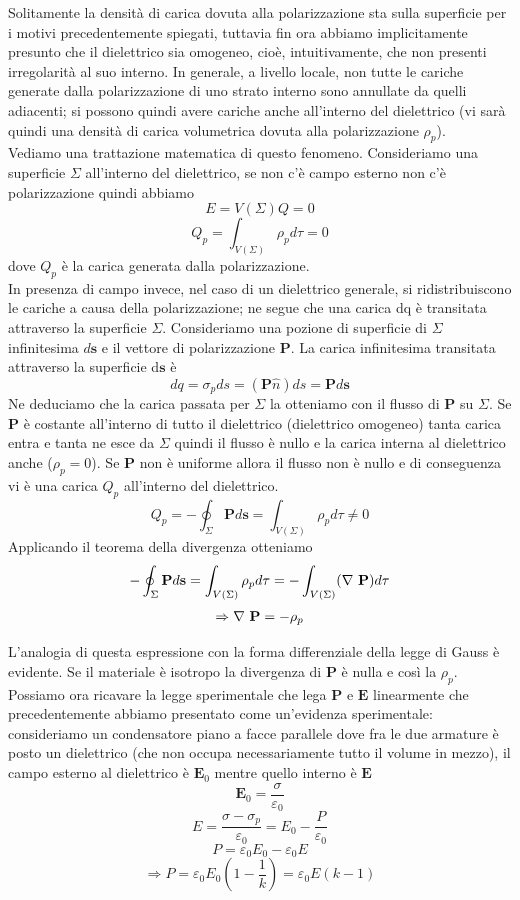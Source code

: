 \documentclass[
10pt, %
a4paper, %
oneside, %
headinclude,footinclude, %
BCOR5mm, %
]{scrartcl}
\begin{document}
Solitamente la densità di carica dovuta alla polarizzazione sta sulla superficie per i motivi precedentemente spiegati, tuttavia fin ora abbiamo implicitamente presunto che il dielettrico sia omogeneo, cioè, intuitivamente, che non presenti irregolarità al suo interno.
In generale, a livello locale, non tutte le cariche generate dalla polarizzazione di uno strato interno sono annullate da quelli adiacenti; si possono quindi avere cariche anche all'interno del dielettrico (vi sarà quindi una densità di carica volumetrica dovuta alla polarizzazione \(\rho_p\)).\\
Vediamo una trattazione matematica di questo fenomeno. Consideriamo una superficie $\Sigma$ all'interno del dielettrico, se non c'è campo esterno non c'è polarizzazione quindi abbiamo
\[E = V(\Sigma) Q = 0\]
\[Q_p = \int_{V(\Sigma)}\rho_p d\tau = 0\]
dove \(Q_p\) è la carica generata dalla polarizzazione.\\
In presenza di campo invece, nel caso di un dielettrico generale, si ridistribuiscono le cariche a causa della polarizzazione; ne segue che una carica dq è transitata attraverso la superficie $\Sigma$. Consideriamo una pozione di superficie di \(\Sigma\) infinitesima $d\mathbf{s}$ e il vettore di polarizzazione $\mathbf{P}$. La carica infinitesima transitata attraverso la superficie d$\mathbf{s}$ è
\[dq = \sigma_pds=(\mathbf{P}\hat{n})ds = \mathbf{P}d\mathbf{s}\]
Ne deduciamo che la carica passata per \(\Sigma\) la otteniamo con il flusso di $\mathbf{P}$ su $\Sigma$. Se $\mathbf{P}$ è costante all'interno di tutto il dielettrico (dielettrico omogeneo) tanta carica entra e tanta ne esce da $\Sigma$ quindi il flusso è nullo e la carica interna al dielettrico anche (\(\rho_p = 0\)). Se $\mathbf{P}$ non è uniforme allora il flusso non è nullo e di conseguenza vi è una carica $Q_p$ all'interno del dielettrico. 
\[ Q_p = -\oint_{\Sigma} \mathbf{P}d\mathbf{s} = \int_{V(\Sigma)}\rho_p d\tau \neq 0 \]
Applicando il teorema della divergenza otteniamo
\[-\oint_{\Sigma} \mathbf{P}d\mathbf{s} = \int_{V(\Sigma)}\rho_p d\tau = -\int_{V(\Sigma)}(\mathbf{\nabla\ }\mathbf{P})d\tau \]
\begin{align}\label{eq:gradiente_vettore_polarizzazione}
\Rightarrow \mathbf{\nabla\ }\mathbf{P} = -\rho_p
\end{align}

L'analogia di questa espressione con la forma differenziale della legge di Gauss è evidente. Se il materiale è isotropo la divergenza di $\mathbf{P}$ è nulla e così la \(\rho_p\).\\
Possiamo ora ricavare la legge sperimentale che lega $\mathbf{P}$ e $\mathbf{E}$ linearmente che precedentemente abbiamo presentato come un'evidenza sperimentale: consideriamo un condensatore piano a facce parallele dove fra le due armature è posto un dielettrico (che non occupa necessariamente tutto il volume in mezzo), il campo esterno al dielettrico è $\mathbf{E}_0$ mentre quello interno è $\mathbf{E}$
\[\mathbf{E}_0 = \frac{\sigma}{\varepsilon_0}\]
\[E = \frac{\sigma - \sigma_p}{\varepsilon_0} = E_0 -\frac{P}{\varepsilon_0}\]
\[P = \varepsilon_0 E_0- \varepsilon_0 E\]
\[\Rightarrow P = \varepsilon_0 E_0 (1-\frac{1}{k}) = \varepsilon_0 E(k-1) \]
\end{document}
